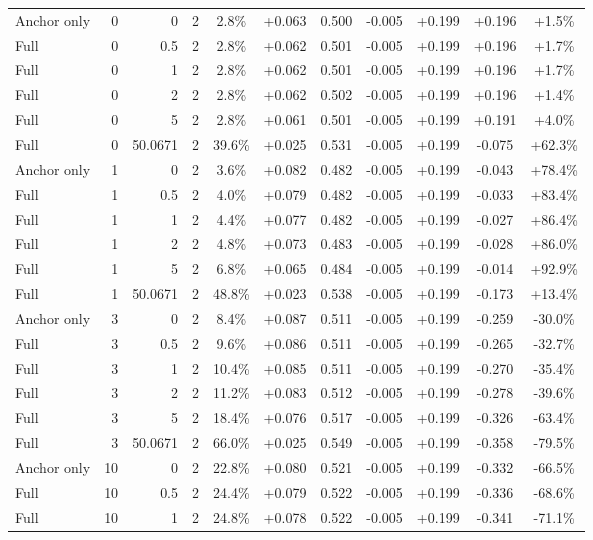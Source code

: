 \begin{table}[htbp]
\begin{tabular}{lrrrccccccc}
Anchor only & 0 & 0 & 2 & 2.8\% & +0.063 & 0.500 & -0.005 & +0.199 & +0.196 & +1.5\% \\
Full & 0 & 0.5 & 2 & 2.8\% & +0.062 & 0.501 & -0.005 & +0.199 & +0.196 & +1.7\% \\
Full & 0 & 1 & 2 & 2.8\% & +0.062 & 0.501 & -0.005 & +0.199 & +0.196 & +1.7\% \\
Full & 0 & 2 & 2 & 2.8\% & +0.062 & 0.502 & -0.005 & +0.199 & +0.196 & +1.4\% \\
Full & 0 & 5 & 2 & 2.8\% & +0.061 & 0.501 & -0.005 & +0.199 & +0.191 & +4.0\% \\
Full & 0 & 50.0671 & 2 & 39.6\% & +0.025 & 0.531 & -0.005 & +0.199 & -0.075 & +62.3\% \\
Anchor only & 1 & 0 & 2 & 3.6\% & +0.082 & 0.482 & -0.005 & +0.199 & -0.043 & +78.4\% \\
Full & 1 & 0.5 & 2 & 4.0\% & +0.079 & 0.482 & -0.005 & +0.199 & -0.033 & +83.4\% \\
Full & 1 & 1 & 2 & 4.4\% & +0.077 & 0.482 & -0.005 & +0.199 & -0.027 & +86.4\% \\
Full & 1 & 2 & 2 & 4.8\% & +0.073 & 0.483 & -0.005 & +0.199 & -0.028 & +86.0\% \\
Full & 1 & 5 & 2 & 6.8\% & +0.065 & 0.484 & -0.005 & +0.199 & -0.014 & +92.9\% \\
Full & 1 & 50.0671 & 2 & 48.8\% & +0.023 & 0.538 & -0.005 & +0.199 & -0.173 & +13.4\% \\
Anchor only & 3 & 0 & 2 & 8.4\% & +0.087 & 0.511 & -0.005 & +0.199 & -0.259 & -30.0\% \\
Full & 3 & 0.5 & 2 & 9.6\% & +0.086 & 0.511 & -0.005 & +0.199 & -0.265 & -32.7\% \\
Full & 3 & 1 & 2 & 10.4\% & +0.085 & 0.511 & -0.005 & +0.199 & -0.270 & -35.4\% \\
Full & 3 & 2 & 2 & 11.2\% & +0.083 & 0.512 & -0.005 & +0.199 & -0.278 & -39.6\% \\
Full & 3 & 5 & 2 & 18.4\% & +0.076 & 0.517 & -0.005 & +0.199 & -0.326 & -63.4\% \\
Full & 3 & 50.0671 & 2 & 66.0\% & +0.025 & 0.549 & -0.005 & +0.199 & -0.358 & -79.5\% \\
Anchor only & 10 & 0 & 2 & 22.8\% & +0.080 & 0.521 & -0.005 & +0.199 & -0.332 & -66.5\% \\
Full & 10 & 0.5 & 2 & 24.4\% & +0.079 & 0.522 & -0.005 & +0.199 & -0.336 & -68.6\% \\
Full & 10 & 1 & 2 & 24.8\% & +0.078 & 0.522 & -0.005 & +0.199 & -0.341 & -71.1\% \\

\end{tabular}
\end{table}
